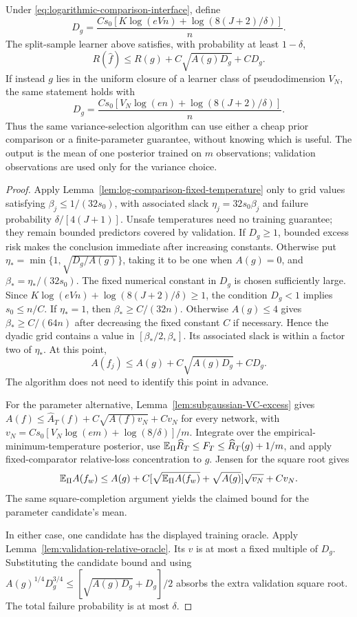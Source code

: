 \begin{theorem}
\label{thm:log-comparison-holdout}
Under \eqref{eq:logarithmic-comparison-interface}, define
\[
 D_g=\frac{C s_0[K\log(eVn)+\log(8(J+2)/\delta)]}{n}.
\]
The split-sample learner above satisfies, with probability at least $1-\delta$,
\begin{equation}
 R(\widehat f)\le R(g)+C\sqrt{A(g)D_g}+CD_g.
 \label{eq:sharp-log-comparison-holdout}
\end{equation}
If instead $g$ lies in the uniform closure of a learner class of pseudodimension $V_N$, the same statement holds with
\[
 D_g=\frac{C s_0[V_N\log(en)+\log(8(J+2)/\delta)]}{n}.
\]
Thus the same variance-selection algorithm can use either a cheap prior comparison or a finite-parameter guarantee, without knowing which is useful. The output is the mean of one posterior trained on $m$ observations; validation observations are used only for the variance choice.
\end{theorem}
\begin{proof}
Apply Lemma~\ref{lem:log-comparison-fixed-temperature} only to grid values satisfying $\beta_j\le1/(32s_0)$, with associated slack $\eta_j=32s_0\beta_j$ and failure probability $\delta/[4(J+1)]$. Unsafe temperatures need no training guarantee; they remain bounded predictors covered by validation. If $D_g\ge1$, bounded excess risk makes the conclusion immediate after increasing constants. Otherwise put
$\eta_* =\min\{1,\sqrt{D_g/A(g)}\}$, taking it to be one when $A(g)=0$, and $\beta_*=\eta_* /(32s_0)$. The fixed numerical constant in $D_g$ is chosen sufficiently large. Since $K\log(eVn)+\log(8(J+2)/\delta)\ge1$, the condition $D_g<1$ implies $s_0\le n/C$. If $\eta_*=1$, then $\beta_*\ge C/(32n)$. Otherwise $A(g)\le4$ gives $\beta_*\ge C/(64n)$ after decreasing the fixed constant $C$ if necessary. Hence the dyadic grid contains a value in $[\beta_*/2,\beta_*]$. Its associated slack is within a factor two of $\eta_*$. At this point,
\[
 A(f_j)\le A(g)+C\sqrt{A(g)D_g}+CD_g.
\]
The algorithm does not need to identify this point in advance.

For the parameter alternative, Lemma~\ref{lem:subgaussian-VC-excess} gives
$A(f)\le\widehat A_T(f)+C\sqrt{A(f)v_N}+Cv_N$
for every network, with $v_N=Cs_0[V_N\log(em)+\log(8/\delta)]/m$.
Integrate over the empirical-minimum-temperature posterior, use
$\mathbb E_\Pi\widehat R_T\le F_T\le\widehat R_T(g)+1/m$, and apply fixed-comparator relative-loss concentration to $g$. Jensen for the square root gives
\[
 \mathbb E_\Pi A(f_w)\le A(g)+
 C[\sqrt{\mathbb E_\Pi A(f_w)}+\sqrt{A(g)}]\sqrt{v_N}+Cv_N.
\]
The same square-completion argument yields the claimed bound for the parameter candidate's mean.

In either case, one candidate has the displayed training oracle. Apply Lemma~\ref{lem:validation-relative-oracle}. Its $v$ is at most a fixed multiple of $D_g$. Substituting the candidate bound and using
$A(g)^{1/4}D_g^{3/4}\le[\sqrt{A(g)D_g}+D_g]/2$
absorbs the extra validation square root. The total failure probability is at most $\delta$.
\end{proof}

